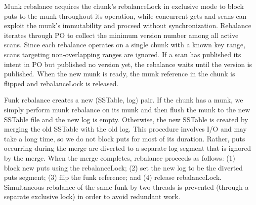 Munk rebalance acquires the chunk's rebalanceLock in exclusive mode to 
block  puts to the munk throughout its operation, while concurrent gets and scans can exploit the munk's 
immutability and proceed without synchronization.  
%
Rebalance iterates through  PO to collect the minimum version number among all active scans. 
Since each rebalance operates on a single chunk with a known key range, scans targeting non-overlapping ranges are ignored.
If a scan has published its intent in  PO but published no version yet, the rebalance waits until the version is published. 
When the new munk is ready, the munk reference in the chunk is flipped and rebalanceLock is released.

Funk rebalance creates a new (SSTable, log) pair. 
If the chunk has a munk, we simply perform munk rebalance on its munk and then flush the munk to the new SSTable file
and the new log is empty.
Otherwise, the new SSTable is created by merging the old SSTable with the old log. 
This procedure involves I/O and may take a long time, so we do not block puts for  most of its duration. 
Rather, puts occurring during the merge are diverted to a separate log segment that is ignored by the merge.
When the merge completes, rebalance proceeds as follows:
(1) block new puts using the {rebalanceLock};
(2) set the new log to be the diverted puts segment;
(3) flip the funk reference; and (4) release {rebalanceLock}. 
Simultaneous rebalance of the same funk by two threads is prevented (through a separate exclusive lock) in order to avoid redundant work. 



